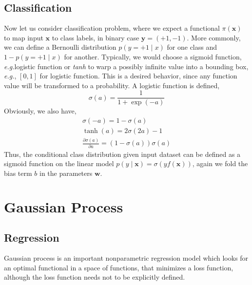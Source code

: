 \documentclass{article}
\newcommand{\eg}{\emph{e.g.}}
\newcommand{\diff}[2]{\frac{\partial #1}{\partial #2}}
\newcommand{\vct}[1]{\ensuremath{\boldsymbol{#1}}} %
\begin{document}
\subsection{Classification}
Now let us consider classification problem, where we expect a functional $ \pi(\vct x) $ to map input $ \vct x $ to class labels, in binary case $ \vct y=\left( +1, -1 \right) $. More commonly, we can define a Bernoulli distribution $ p(y=+1 \mid x) $ for one class and $ 1-p\left( y=+1 \mid x \right) $ for another. Typically, we would choose a sigmoid function, \eg logistic function or \textit{tanh} to warp a possibly infinite value into a bounding box, \eg, $ \left\lbrack 0, 1 \right\rbrack $ for logistic function. This is a desired behavior, since any function value will be transformed to a probability. A logistic function is defined,
\[ \sigma(a) = \frac{1}{1+\exp(-a)} \]
Obviously, we also have, 
\begin{align*}
\sigma(-a) = 1-\sigma(a) \\
\tanh(a) = 2\sigma(2a) -1 \\
\diff{\sigma(a)}{a} = \left( 1-\sigma(a) \right)\sigma(a)
\end{align*}
Thus, the conditional class distribution given input dataset can be defined as a sigmoid function on the linear model $ p\left( y \mid \vct x \right) = \sigma(yf(\vct x))$, again we fold the bias term $ b $ in the parameters $ \vct w $. 

\section{Gaussian Process}
\subsection{Regression}
\label{sec:gpr}
Gaussian process is an important nonparametric regression model which looks for an optimal functional in a space of functions, that minimizes a loss function, although the loss function needs not to be explicitly defined. \cite{rw06gp}
\end{document}
